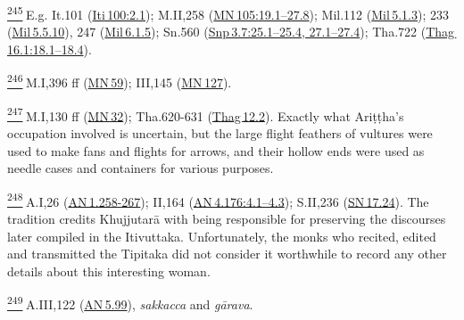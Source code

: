\label{footprints_split_024.html_fn245}
\hyperref[footprints_split_010.htmlux5cux23fnref245]{\textsuperscript{245}} E.g.
It.101
(\href{https://suttacentral.net/iti100/en/sujato\#2.1}{Iti\,100:2.1});
M.II,258
(\href{https://suttacentral.net/mn105/en/sujato\#19.1}{MN\,105:19.1--27.8});
Mil.112 (\href{https://suttacentral.net/mil5.1.3}{Mil\,5.1.3}); 233
(\href{https://suttacentral.net/mil5.5.10/en/tw_rhysdavids\#pts-vp-pli233}{Mil\,5.5.10}),
247
(\href{https://suttacentral.net/mil6.1.5/en/tw_rhysdavids\#pts-vp-pli247}{Mil\,6.1.5});
Sn.560
(\href{https://suttacentral.net/snp3.7/en/sujato\#25.1}{Snp\,3.7:25.1--25.4,
27.1--27.4}); Tha.722
(\href{https://suttacentral.net/thag16.1/en/sujato\#18.1}{Thag\,16.1:18.1--18.4}).

\label{footprints_split_024.html_fn246}
\hyperref[footprints_split_010.htmlux5cux23fnref246]{\textsuperscript{246}} M.I,396
ff (\href{https://suttacentral.net/mn59/en/sujato}{MN\,59}); III,145
(\href{https://suttacentral.net/mn127/en/sujato}{MN\,127}).

\label{footprints_split_024.html_fn247}
\hyperref[footprints_split_010.htmlux5cux23fnref247]{\textsuperscript{247}} M.I,130
ff (\href{https://suttacentral.net/mn32/en/sujato}{MN\,32}); Tha.620-631
(\href{https://suttacentral.net/thag12.2/en/sujato}{Thag\,12.2}).
Exactly what Ariṭṭha's occupation involved is uncertain, but the large
flight feathers of vultures were used to make fans and flights for
arrows, and their hollow ends were used as needle cases and containers
for various purposes.

\label{footprints_split_024.html_fn248}
\hyperref[footprints_split_010.htmlux5cux23fnref248]{\textsuperscript{248}} A.I,26
(\href{https://suttacentral.net/an1.258-267/en/sujato}{AN\,1.258-267});
II,164
(\href{https://suttacentral.net/an4.176/en/sujato\#4.1}{AN\,4.176:4.1--4.3});
S.II,236 (\href{https://suttacentral.net/sn17.24/en/sujato}{SN\,17.24}).
The tradition credits Khujjutarā with being responsible for preserving
the discourses later compiled in the Itivuttaka. Unfortunately, the
monks who recited, edited and transmitted the Tipitaka did not consider
it worthwhile to record any other details about this interesting woman.

\label{footprints_split_024.html_fn249}
\hyperref[footprints_split_010.htmlux5cux23fnref249]{\textsuperscript{249}} A.III,122
(\href{https://suttacentral.net/an5.99/en/sujato}{AN\,5.99}),
\emph{sakkacca} and \emph{gārava}.

